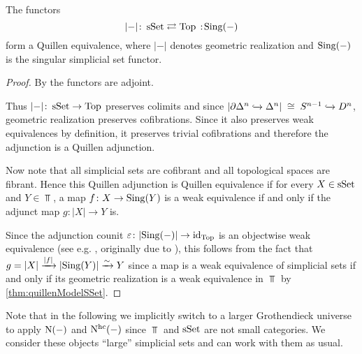 \begin{thm}\label{prop:quillenEqSSetTop}
    The functors
    \begin{equation*}
        \lvert-\rvert\colon\sSet\rightleftarrows\Top\mkern+3mu:\mkern-3mu\Sing(-)
    \end{equation*}
    form a Quillen equivalence, where $\lvert-\rvert$ denotes geometric realization and $\operatorname{Sing}(-)$ is the singular simplicial set functor.
    \begin{proof}
        By \cite[Corollary 1.1.8.5]{kerodon} the functors are adjoint.

        Thus $\lvert-\rvert\colon\operatorname{sSet}\to\operatorname{Top}$ preserves colimits and since $\lvert\partial\Delta^n\xhookrightarrow{}\Delta^n\rvert\;\cong\;S^{n-1}\xhookrightarrow{} D^n$, geometric realization preserves cofibrations.
        Since it also preserves weak equivalences by definition, it preserves trivial cofibrations and therefore the adjunction is a Quillen adjunction.

        Now note that all simplicial sets are cofibrant and all topological spaces are fibrant.
        Hence this Quillen adjunction is Quillen equivalence if for every $X\in\operatorname{sSet}$ and $Y\in\Top$, a map $f\colon X\to\operatorname{Sing}(Y)$ is a weak equivalence if and only if the adjunct map $g\colon\lvert X\rvert\to Y$ is.
        
        Since the adjunction counit $\varepsilon\colon\lvert\operatorname{Sing}(-)\rvert\to\text{id}_{\operatorname{Top}}$ is an objectwise weak equivalence (see e.g. \cite[Corollary 3.5.4.2]{kerodon}, originally due to \cite{giever_counit}), this follows from the fact that $g=\lvert X\rvert\xrightarrow{\lvert f\rvert}\lvert\operatorname{Sing}(Y)\rvert\xrightarrow{\sim} Y$ since a map is a weak equivalence of simplicial sets if and only if its geometric realization is a weak equivalence in $\Top$ by \cref{thm:quillenModelSSet}.
    \end{proof}
\end{thm}
\begin{remark}
    Note that in the following we implicitly switch to a larger Grothendieck universe to apply $\operatorname{N}(-)$ and $\operatorname{N^{hc}}(-)$ since $\Top$ and $\operatorname{sSet}$ are not small categories.
    We consider these objects ``large'' simplicial sets and can work with them as usual.
\end{remark}
